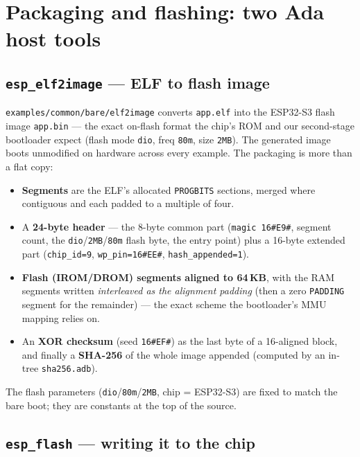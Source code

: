 \section{Packaging and flashing: two Ada host tools}

\subsection{\texttt{esp\_elf2image} --- ELF to flash image}

\texttt{examples/common/bare/elf2image} converts \texttt{app.elf} into the
ESP32-S3 flash image \texttt{app.bin} --- the exact on-flash format the chip's
ROM and our second-stage bootloader expect (flash mode \texttt{dio}, freq
\texttt{80m}, size \texttt{2MB}). The generated image boots unmodified on
hardware across every example. The packaging is more than a flat copy:

\begin{itemize}
  \item \textbf{Segments} are the ELF's allocated \texttt{PROGBITS} sections,
        merged where contiguous and each padded to a multiple of four.
  \item A \textbf{24-byte header} --- the 8-byte common part (\texttt{magic 16\#E9\#},
        segment count, the \texttt{dio}/\texttt{2MB}/\texttt{80m} flash byte, the
        entry point) plus a 16-byte extended part (\texttt{chip\_id=9},
        \texttt{wp\_pin=16\#EE\#}, \texttt{hash\_appended=1}).
  \item \textbf{Flash (IROM/DROM) segments aligned to 64\,KB}, with the RAM
        segments written \emph{interleaved as the alignment padding} (then a zero
        \texttt{PADDING} segment for the remainder) --- the exact scheme the
        bootloader's MMU mapping relies on.
  \item An \textbf{XOR checksum} (seed \texttt{16\#EF\#}) as the last byte of a
        16-aligned block, and finally a \textbf{SHA-256} of the whole image
        appended (computed by an in-tree \texttt{sha256.adb}).
\end{itemize}

The flash parameters (\texttt{dio}/\texttt{80m}/\texttt{2MB}, chip = ESP32-S3) are
fixed to match the bare boot; they are constants at the top of the source.

\subsection{\texttt{esp\_flash} --- writing it to the chip}

